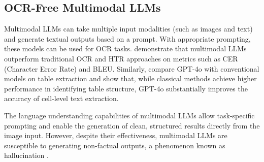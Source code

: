 
\subsection{OCR-Free Multimodal LLMs}
Multimodal LLMs can take multiple input modalities (such as images and text) and generate textual outputs based on a prompt. With appropriate prompting, these models can be used for OCR tasks. \textcite{DBLP:journals/corr/abs-2501-11623} demonstrate that multimodal LLMs outperform traditional OCR and HTR approaches on metrics such as CER (Character Error Rate) and BLEU. Similarly, \textcite{nunes-etal-2025-benchmarking} compare GPT-4o with conventional models on table extraction and show that, while classical methods achieve higher performance in identifying table structure, GPT-4o substantially improves the accuracy of cell-level text extraction.

The language understanding capabilities of multimodal LLMs allow task-specific prompting and enable the generation of clean, structured results directly from the image input. However, despite their effectiveness, multimodal LLMs are susceptible to generating non-factual outputs, a phenomenon known as hallucination \parencite{DBLP:journals/corr/abs-2404-18930, DBLP:journals/corr/abs-2410-12787}.



